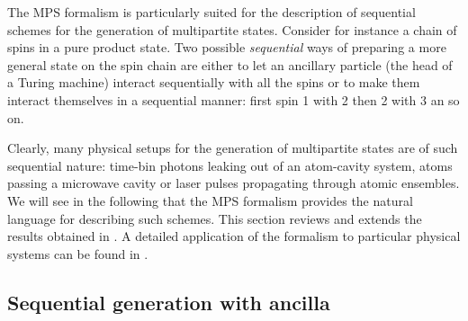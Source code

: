 \documentclass[aps,prl,epsfig,graphics,floatfix,mathbbm,a4paper]{article}
\newcommand{\1}{\mathbbm{1}}
\renewcommand{\>}{\rangle}
\newcommand{\<}{\langle}
\begin{document}
The MPS formalism is particularly suited for the description of
sequential schemes for the generation of multipartite states.
Consider for instance a chain of spins in a pure product state.
Two possible \emph{sequential} ways of preparing a more general
state on the spin chain are either to let an ancillary particle
(the head of a Turing machine) interact sequentially with all the
spins or to make them interact themselves in a sequential manner:
first spin 1 with 2 then 2 with 3 an so on.

Clearly, many physical setups for the generation of multipartite
states are of such sequential nature: time-bin photons leaking out
of an atom-cavity system, atoms passing a microwave cavity or
laser pulses propagating through atomic ensembles. We will see in
the following that the MPS formalism provides the natural language
for describing such schemes. This section reviews and extends the
results obtained in \cite{SSVCW}. A detailed application of the
formalism to particular physical systems can be found in
\cite{SSVCW,SSVCW2}.

\subsection{Sequential generation with ancilla}
\end{document}
